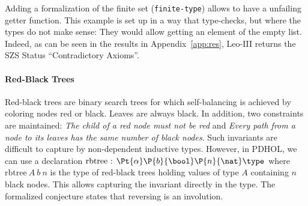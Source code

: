 Adding a formalization of the finite set (\texttt{finite-type}) allows to have a unfailing
getter function. This example is set up in a way that type-checks, but where the types do not
make sense: They would allow getting an element of the empty list. Indeed, as can be seen in
the results in Appendix~\ref{app:res}, Leo-III returns the SZS Status ``Contradictory Axioms''.

\vspace{-3mm}
\paragraph*{Red-Black Trees}
Red-black trees are binary search trees for which self-balancing is 
achieved by coloring 
nodes
red or black.
Leaves are always black. In addition, two
constraints are maintained: \emph{The child of a red node must not be red} and
\emph{Every path from a node to its leaves has the same number of black nodes}.
Such invariants are difficult to capture by non-dependent inductive types.
However, in PDHOL, we can use a declaration 
\(\text{rbtree : } \Pt{\alpha}\P{b}{\bool}\P{n}{\nat} \type\) 
where
\(\text{rbtree}\ A\ b\ n\)
is the type of red-black trees holding values of type \(A\)
containing \(n\) black nodes. This allows capturing the invariant directly in the type.
The formalized conjecture states that reversing is an involution.


